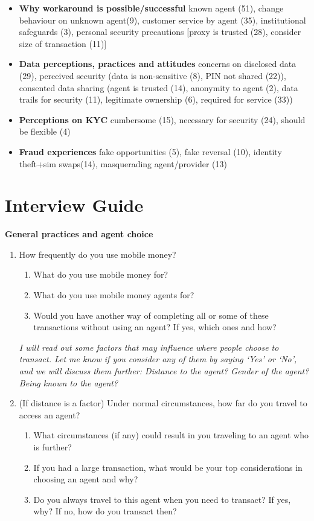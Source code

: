 \begin{appendices}
\begin{itemize}
    \medskip
     \item \textbf{Why workaround is possible/successful}
    known agent (51), change behaviour on unknown agent(9), customer service by agent (35), institutional safeguards (3), personal security precautions [proxy is trusted (28), consider size of transaction (11)]
    \medskip
    \item \textbf{Data perceptions, practices and attitudes}
    concerns on disclosed data (29), perceived security (data is  non-sensitive (8), PIN not shared (22)), consented data sharing (agent is trusted (14), anonymity to agent (2), data trails for security (11), legitimate ownership (6), required for service (33)) 
    \medskip
    \item \textbf{Perceptions on KYC}
    cumbersome (15), necessary for security (24), should be flexible (4)
    \medskip
    \item \textbf{Fraud experiences}
    fake opportunities (5), fake reversal (10), identity theft+sim swaps(14), masquerading agent/provider (13)
     
\end{itemize}
\newpage
\section{Interview Guide}
\label{Appendix_IDI}
\textbf{General practices and agent choice}
\begin{enumerate}
    \item How frequently do you use mobile money?
    \begin{enumerate}[label=(\alph*)]
        \item What do you use mobile money for?
        \item What do you use mobile money agents for?
        \item Would you have another way of completing all or some of these transactions without using an agent? If yes, which ones and how? 
    \end{enumerate}

\textit{I will read out some factors that may influence where people choose to transact. Let me know if you consider any of them by saying ‘Yes’ or ‘No’, and we will discuss them further: Distance to the agent? Gender of the agent? Being known to the agent?}

    \item (If distance is a factor) Under normal circumstances, how far do you travel to access an agent?
    \begin{enumerate}
        \item What circumstances (if any) could result in you traveling to an agent who is further? 
        \item If you had a large transaction, what would be your top considerations in choosing an agent and why?
        \item Do you always travel to this agent when you need to transact? If yes, why? If no, how do you transact then?
    \end{enumerate}


\end{enumerate}
\end{appendices}
